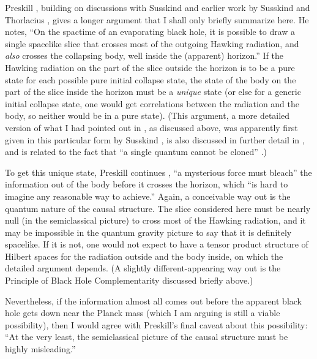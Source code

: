      Preskill \cite{Pre92}, building on discussions with Susskind and
earlier
work by Susskind and Thorlacius \cite{SusTho}, gives a longer
argument that I
shall only briefly summarize here.  He notes, ``On the spactime of an
evaporating black hole, it is possible to draw a single spacelike
slice that
crosses most of the outgoing Hawking radiation, and {\it also}
crosses the
collapsing body, well inside the (apparent) horizon.''  If the
Hawking
radiation
on the part of the slice outside the horizon is to be a pure state
for each
possible pure initial collapse state, the state of the body on the
part of the
slice inside the horizon must be a {\it unique} state (or else for a
generic
initial collapse state, one would get correlations between the
radiation and
the body, so neither would be in a pure state).  (This argument,
a more detailed version of what I had pointed out in \cite{Pag80b},
as discussed above, was apparently first given in this particular
form by
Susskind \cite{SusAsp}, is also discussed in further detail in
\cite{DanSch,STU}, and is related to the fact that ``a single
quantum cannot be cloned'' \cite{WooZur}.)

    To get this unique state, Preskill continues \cite{Pre92}, ``a
mysterious
force must bleach'' the information out of the body before it crosses
the
horizon, which ``is hard to imagine any reasonable way to achieve.''
Again, a
conceivable way out is the quantum nature of the causal structure.
The slice
considered here must be nearly null (in the semiclassical picture) to
cross
most of the Hawking radiation, and it may be impossible in the
quantum gravity
picture to say that it is definitely spacelike.  If it is not, one
would not
expect to have a tensor product structure of Hilbert spaces for the
radiation
outside and the body inside, on which the detailed argument depends.
(A
slightly different-appearing  way out is the Principle of Black Hole
Complementarity \cite{STU,Sus,SusT} discussed briefly above.)

     Nevertheless, if the information almost all comes out
before the apparent black hole gets down near the Planck mass (which
I
am arguing is still a viable possibility), then I would
agree with Preskill's final caveat about this possibility:  ``At the
very
least, the semiclassical picture of the causal structure must be
highly
misleading.''

